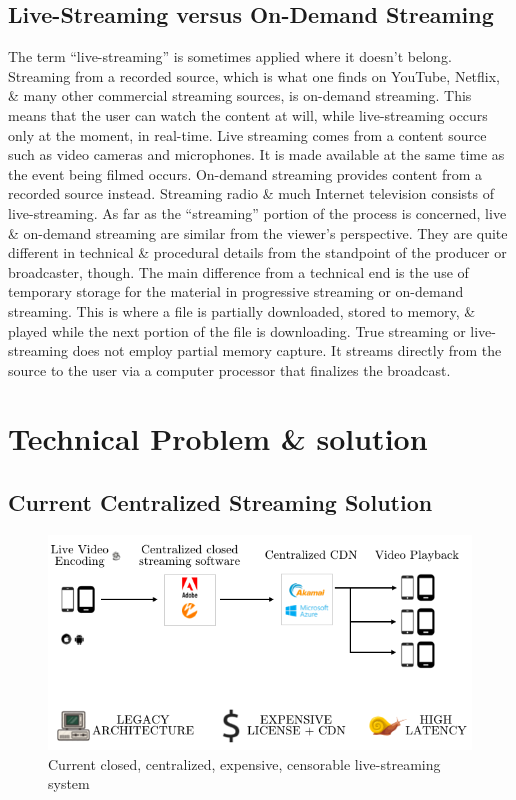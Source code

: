 \documentclass{article}
\begin{document}
\subsection{Live-Streaming versus On-Demand Streaming}
The term “live-streaming” is sometimes applied where it doesn’t belong. Streaming from a recorded source, which is what one finds on YouTube, Netflix, \& many other commercial streaming sources, is on-demand streaming. This means that the user can watch the content at will, while live-streaming occurs only at the moment, in real-time. Live streaming comes from a content source such as video cameras and microphones. It is made available at the same time as the event being filmed occurs. On-demand streaming provides content from a recorded source instead. Streaming radio \& much Internet television consists of live-streaming. As far as the “streaming” portion of the process is concerned, live \& on-demand streaming are similar from the viewer’s perspective. They are quite different in technical \& procedural details from the standpoint of the producer or broadcaster, though. The main difference from a technical end is the use of temporary storage for the material in progressive streaming or on-demand streaming. This is where a file is partially downloaded, stored to memory, \& played while the next portion of the file is downloading. True streaming or live-streaming does not employ partial memory capture. It streams directly from the source to the user via a computer processor that finalizes the broadcast.


\section{Technical Problem \& solution}

\subsection{Current Centralized Streaming Solution}

\begin{figure}[h!]
 \centering
 \includegraphics[width=1.0\textwidth]{static/problem-architecture-trans-cmrfont}
 \caption{Current closed, centralized, expensive, censorable live-streaming system}
 \label{image:problem-architecture-trans-cmrfont}
\end{figure}
\end{document}
